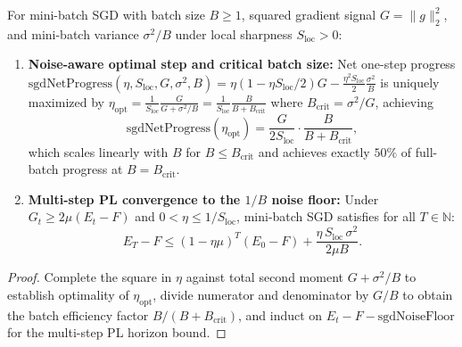\begin{lemma}\label{lem:stochastic_sharpness_sgd}
\leanok
{}
For mini-batch SGD with batch size $B\ge 1$, squared gradient signal $G = \|g\|_2^2$, and mini-batch variance $\sigma^2/B$ under local sharpness $S_{\mathrm{loc}} > 0$:
\begin{enumerate}
\item \textbf{Noise-aware optimal step and critical batch size:} Net one-step progress $\mathrm{sgdNetProgress}(\eta, S_{\mathrm{loc}}, G, \sigma^2, B) = \eta(1 - \eta S_{\mathrm{loc}}/2)G - \frac{\eta^2 S_{\mathrm{loc}}}{2}\frac{\sigma^2}{B}$ is uniquely maximized by $\eta_{\mathrm{opt}} = \frac{1}{S_{\mathrm{loc}}}\frac{G}{G + \sigma^2/B} = \frac{1}{S_{\mathrm{loc}}}\frac{B}{B + B_{\mathrm{crit}}}$ where $B_{\mathrm{crit}} = \sigma^2/G$, achieving
\[
\mathrm{sgdNetProgress}(\eta_{\mathrm{opt}}) = \frac{G}{2 S_{\mathrm{loc}}}\cdot\frac{B}{B + B_{\mathrm{crit}}},
\]
which scales linearly with $B$ for $B\le B_{\mathrm{crit}}$ and achieves exactly $50\%$ of full-batch progress at $B = B_{\mathrm{crit}}$.
\item \textbf{Multi-step PL convergence to the $1/B$ noise floor:} Under $G_t \ge 2\mu(E_t - F)$ and $0 < \eta \le 1/S_{\mathrm{loc}}$, mini-batch SGD satisfies for all $T\in\mathbb{N}$:
\[
E_T - F \le (1 - \eta\mu)^T(E_0 - F) + \frac{\eta\,S_{\mathrm{loc}}\,\sigma^2}{2\mu B}.
\]
\end{enumerate}
\end{lemma}
\begin{proof}
\leanok
Complete the square in $\eta$ against total second moment $G + \sigma^2/B$ to establish optimality of $\eta_{\mathrm{opt}}$, divide numerator and denominator by $G/B$ to obtain the batch efficiency factor $B/(B + B_{\mathrm{crit}})$, and induct on $E_t - F - \mathrm{sgdNoiseFloor}$ for the multi-step PL horizon bound.
\end{proof}

